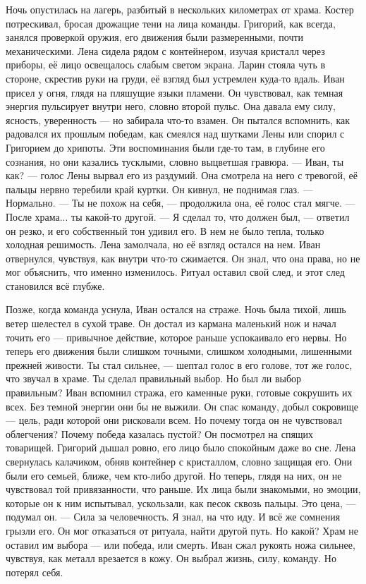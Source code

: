 \documentclass[12pt,a4paper]{book}
\begin{document}
Ночь опустилась на лагерь, разбитый в нескольких километрах от храма. Костер потрескивал, бросая дрожащие тени на лица команды. Григорий, как всегда, занялся проверкой оружия, его движения были размеренными, почти механическими. Лена сидела рядом с контейнером, изучая кристалл через приборы, её лицо освещалось слабым светом экрана. Ларин стояла чуть в стороне, скрестив руки на груди, её взгляд был устремлен куда-то вдаль.
Иван присел у огня, глядя на пляшущие языки пламени. Он чувствовал, как темная энергия пульсирует внутри него, словно второй пульс. Она давала ему силу, ясность, уверенность — но забирала что-то взамен. Он пытался вспомнить, как радовался их прошлым победам, как смеялся над шутками Лены или спорил с Григорием до хрипоты. Эти воспоминания были где-то там, в глубине его сознания, но они казались тусклыми, словно выцветшая гравюра.
— Иван, ты как? — голос Лены вырвал его из раздумий. Она смотрела на него с тревогой, её пальцы нервно теребили край куртки.
Он кивнул, не поднимая глаз. — Нормально.
— Ты не похож на себя, — продолжила она, её голос стал мягче. — После храма... ты какой-то другой.
— Я сделал то, что должен был, — ответил он резко, и его собственный тон удивил его. В нем не было тепла, только холодная решимость.
Лена замолчала, но её взгляд остался на нем. Иван отвернулся, чувствуя, как внутри что-то сжимается. Он знал, что она права, но не мог объяснить, что именно изменилось. Ритуал оставил свой след, и этот след становился всё глубже.

Позже, когда команда уснула, Иван остался на страже. Ночь была тихой, лишь ветер шелестел в сухой траве. Он достал из кармана маленький нож и начал точить его — привычное действие, которое раньше успокаивало его нервы. Но теперь его движения были слишком точными, слишком холодными, лишенными прежней живости.
Ты стал сильнее, — шептал голос в его голове, тот же голос, что звучал в храме. Ты сделал правильный выбор.
Но был ли выбор правильным? Иван вспомнил стража, его каменные руки, готовые сокрушить их всех. Без темной энергии они бы не выжили. Он спас команду, добыл сокровище — цель, ради которой они рисковали всем. Но почему тогда он не чувствовал облегчения? Почему победа казалась пустой?
Он посмотрел на спящих товарищей. Григорий дышал ровно, его лицо было спокойным даже во сне. Лена свернулась калачиком, обняв контейнер с кристаллом, словно защищая его. Они были его семьей, ближе, чем кто-либо другой. Но теперь, глядя на них, он не чувствовал той привязанности, что раньше. Их лица были знакомыми, но эмоции, которые он к ним испытывал, ускользали, как песок сквозь пальцы.
Это цена, — подумал он. — Сила за человечность. Я знал, на что иду.
И всё же сомнения грызли его. Он мог отказаться от ритуала, найти другой путь. Но какой? Храм не оставил им выбора — или победа, или смерть. Иван сжал рукоять ножа сильнее, чувствуя, как металл врезается в кожу. Он выбрал жизнь, силу, команду. Но потерял себя.
\end{document}

